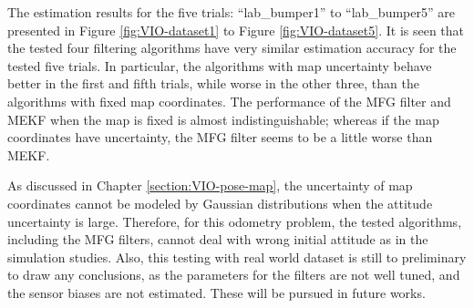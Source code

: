 The estimation results for the five trials: ``lab\_bumper1'' to ``lab\_bumper5'' are presented in Figure \ref{fig:VIO-dataset1} to Figure \ref{fig:VIO-dataset5}.
It is seen that the tested four filtering algorithms have very similar estimation accuracy for the tested five trials.
In particular, the algorithms with map uncertainty behave better in the first and fifth trials, while worse in the other three, than the algorithms with fixed map coordinates.
The performance of the MFG filter and MEKF when the map is fixed is almost indistinguishable; whereas if the map coordinates have uncertainty, the MFG filter seems to be a little worse than MEKF.

As discussed in Chapter \ref{section:VIO-pose-map}, the uncertainty of map coordinates cannot be modeled by Gaussian distributions when the attitude uncertainty is large.
Therefore, for this odometry problem, the tested algorithms, including the MFG filters, cannot deal with wrong initial attitude as in the simulation studies.
Also, this testing with real world dataset is still to preliminary to draw any conclusions, as the parameters for the filters are not well tuned, and the sensor biases are not estimated.
These will be pursued in future works.

